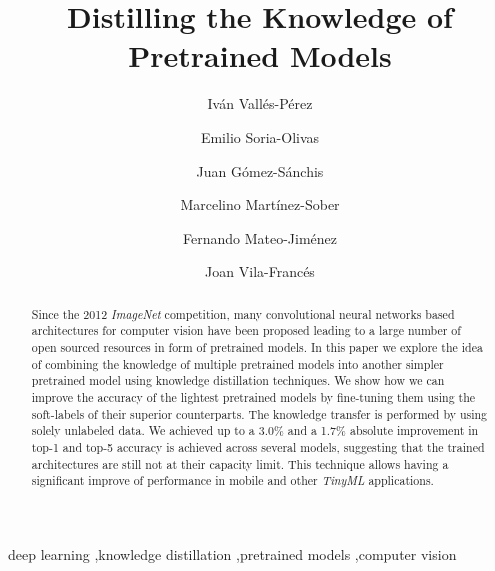 \documentclass{elsarticle}
\begin{document}
	\begin{frontmatter}
		\title{Distilling the Knowledge of Pretrained Models}
		\author[UV]{Iván Vallés-Pérez}
		\author[UV]{Emilio Soria-Olivas}
		\author[UV]{Juan Gómez-Sánchis}
		\author[UV]{Marcelino Martínez-Sober}%
		\author[UV]{Fernando Mateo-Jiménez}
		\author[UV]{Joan Vila-Francés}
		\address[UV]{Escola Tècnica Superior d\textsc{}Enginyeria, University of Valencia, Avenida de la Universitat s/n 46100 Burjassot, Valencia, Spain}

		\begin{abstract}
		Since the 2012 \textit{ImageNet} competition, many convolutional neural networks based architectures for computer vision have been proposed leading to a large number of open sourced resources in form of pretrained models. In this paper we explore the idea of combining the knowledge of multiple pretrained models into another simpler pretrained model using knowledge distillation techniques. We show how we can improve the accuracy of the lightest pretrained models by fine-tuning them using the soft-labels of their superior counterparts. The knowledge transfer is performed by using solely unlabeled data. We achieved up to a 3.0\% and a 1.7\% absolute improvement in top-1 and top-5 accuracy is achieved across several models, suggesting that the trained architectures are still not at their capacity limit. This technique allows having a significant improve of performance in mobile and other \textit{TinyML} applications.
		\end{abstract}
		
		\begin{keyword}
			deep learning \sep knowledge distillation \sep pretrained models \sep computer vision  
		\end{keyword}
		
	\end{frontmatter}
	
	\linenumbers
	
\end{document}
